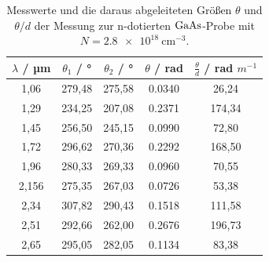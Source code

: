 \begin{table}[h]
  \centering
  \caption{Messwerte und die daraus abgeleiteten Größen $\theta$ und $\theta/d$ der Messung zur n-dotierten $\ce{GaAs}$-Probe mit $N=\SI{2,8e18}{\centi\meter^{-3}}$.}
  \label{tab:probe2}
  \begin{tabular}{S[table-format=1.1] S S S S}
    {$\lambda$ / µm} & {$\theta_1$ / °} & {$\theta_2$ / °} & {$\theta$ / rad} & {$\frac{\theta}{d}$ / rad $m^{-1}$}\\
    ,06 &  279,48 &  275,58 & 0.0340 & 26,24\\
    1,29 &  234,25 &  207,08 & 0.2371 & 174,34\\
    1,45 &  256,50 &  245,15 & 0.0990 & 72,80\\
    1,72 &  296,62 &  270,36 & 0.2292 & 168,50\\
    1,96 &  280,33 &  269,33 & 0.0960 & 70,55\\
    2,156 & 275,35 &  267,03 & 0.0726 & 53,38\\
    2,34 & 307,82 &  290,43 & 0.1518 & 111,58\\
    2,51 & 292,66 &  262,00 & 0.2676 & 196,73\\
    2,65 & 295,05 &  282,05 & 0.1134 & 83,38\\
  \end{tabular}
\end{table}

